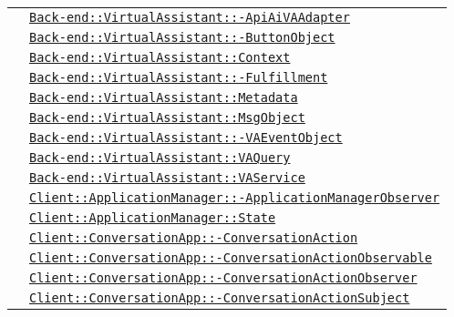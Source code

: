 \begin{longtable}{|>{\centering}m{3cm}|m{10cm}<{\centering}|}
& \hyperref[Back-end::VirtualAssistant::ApiAiVAAdapter]{\texttt{Back-end::VirtualAssistant::-\linebreak ApiAiVAAdapter}}\\
& \hyperref[Back-end::VirtualAssistant::ButtonObject]{\texttt{Back-end::VirtualAssistant::-\linebreak ButtonObject}}\\
& \hyperref[Back-end::VirtualAssistant::Context]{\texttt{Back-end::VirtualAssistant::Context}}\\
& \hyperref[Back-end::VirtualAssistant::Fulfillment]{\texttt{Back-end::VirtualAssistant::-\linebreak Fulfillment}}\\
& \hyperref[Back-end::VirtualAssistant::Metadata]{\texttt{Back-end::VirtualAssistant::Metadata}}\\
& \hyperref[Back-end::VirtualAssistant::MsgObject]{\texttt{Back-end::VirtualAssistant::MsgObject}}\\
& \hyperref[Back-end::VirtualAssistant::VAEventObject]{\texttt{Back-end::VirtualAssistant::-\linebreak VAEventObject}}\\
& \hyperref[Back-end::VirtualAssistant::VAQuery]{\texttt{Back-end::VirtualAssistant::VAQuery}}\\
& \hyperref[Back-end::VirtualAssistant::VAService]{\texttt{Back-end::VirtualAssistant::VAService}}\\
& \hyperref[Client::ApplicationManager::ApplicationManagerObserver]{\texttt{Client::ApplicationManager::-\linebreak ApplicationManagerObserver}}\\
& \hyperref[Client::ApplicationManager::State]{\texttt{Client::ApplicationManager::State}}\\
& \hyperref[Client::ConversationApp::ConversationAction]{\texttt{Client::ConversationApp::-\linebreak ConversationAction}}\\
& \hyperref[Client::ConversationApp::ConversationActionObservable]{\texttt{Client::ConversationApp::-\linebreak ConversationActionObservable}}\\
& \hyperref[Client::ConversationApp::ConversationActionObserver]{\texttt{Client::ConversationApp::-\linebreak ConversationActionObserver}}\\
& \hyperref[Client::ConversationApp::ConversationActionSubject]{\texttt{Client::ConversationApp::-\linebreak ConversationActionSubject}}\\

\end{longtable}
